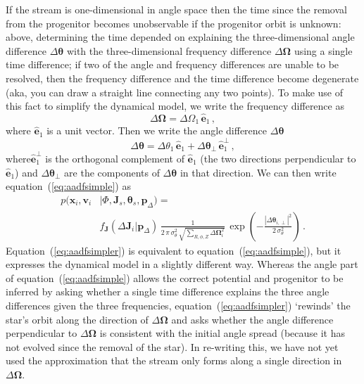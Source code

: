 \documentclass[12pt,preprint]{aastex}
\newcommand{\eqnname}{equation}
\newcommand{\Eqnname}{Equation}
\renewcommand{\vec}[1]{\ensuremath{\mathbf{#1}}}
\newcommand{\unitvec}[1]{\ensuremath{\mathbf{\hat{#1}}}}
\newcommand{\vecx}{\ensuremath{\vec{x}}}
\newcommand{\vecv}{\ensuremath{\vec{v}}}
\newcommand{\vecj}{\ensuremath{\vec{J}}}
\newcommand{\veco}{\ensuremath{\vec{\Omega}}}
\newcommand{\veca}{\ensuremath{\boldsymbol\theta}}
\newcommand{\paramsdiff}{\ensuremath{\vec{p}_\Delta}}
\begin{document}
If the stream is one-dimensional in angle space then the time since
the removal from the progenitor becomes unobservable if the progenitor
orbit is unknown: above, determining the time depended on explaining
the three-dimensional angle difference $\Delta \veca$ with the
three-dimensional frequency difference $\Delta \veco$ using a single
time difference; if two of the angle and frequency differences are
unable to be resolved, then the frequency difference and the time
difference become degenerate (aka, you can draw a straight line
connecting any two points). To make use of this fact to simplify the
dynamical model, we write the frequency difference as
\begin{equation}
  \Delta \veco = \Delta \Omega_1\,\unitvec{e}_1\,,
\end{equation}
where $\unitvec{e}_1$ is a unit vector. Then we write the angle
difference $\Delta \veca$ 
\begin{equation}
  \Delta \veca = \Delta \theta_1\,\unitvec{e}_1 + \Delta \veca_\perp\,\unitvec{e}_1^\perp\,,
\end{equation}
where$\unitvec{e}_1^\perp$ is the orthogonal complement of
$\unitvec{e}_1$ (the two directions perpendicular to $\unitvec{e}_1$)
and $\Delta \veca_\perp$ are the components of $\Delta \veca$ in that
direction. We can then write \eqnname~(\ref{eq:aadfsimple}) as
\begin{equation}\label{eq:aadfsimpler}
\begin{split}
  p(\vecx_i,\vecv_i & | \Phi,\vecj_s,\veca_s,\paramsdiff) 
   = \\
   & f_{\vecj}(\Delta \vecj_i|\paramsdiff) \,  \frac{1}{2\,\pi\,\sigma_\theta^2\,\sqrt{\sum_{R,\phi,Z}\Delta \veco_i^2}}\,\exp\left(-\frac{|\Delta\veca_{i,\perp}|^2}{2\,\sigma_\theta^2}\right)\,.
\end{split}
\end{equation}
\Eqnname~(\ref{eq:aadfsimpler}) is equivalent to
\eqnname~(\ref{eq:aadfsimple}), but it expresses the dynamical model
in a slightly different way. Whereas the angle part of
\eqnname~(\ref{eq:aadfsimple}) allows the correct potential and
progenitor to be inferred by asking whether a single time difference
explains the three angle differences given the three frequencies,
\eqnname~(\ref{eq:aadfsimpler}) `rewinds' the star's orbit along the
direction of $\Delta \veco$ and asks whether the angle difference
perpendicular to $\Delta \veco$ is consistent with the initial angle
spread (because it has not evolved since the removal of the star). In
re-writing this, we have not yet used the approximation that the
stream only forms along a single direction in $\Delta \veco$.
\end{document}
